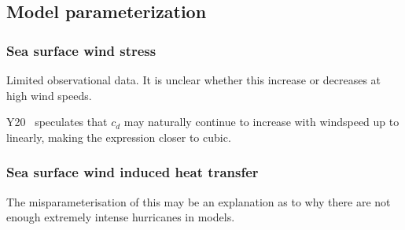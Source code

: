 \subsection{Model parameterization}
\subsubsection{Sea surface wind stress}
Limited observational data.
It is unclear whether this increase or decreases at high wind speeds.
\cite{powell2003reduced, donelan2004limiting}

Y20~\cite{ZannaPreprint} speculates that $c_d$ may naturally continue
to increase with windspeed up to linearly, making the expression
closer to cubic.


\subsubsection{Sea surface wind induced heat transfer}
The misparameterisation of this may be an explanation as to why there are
not enough extremely intense hurricanes in models.

